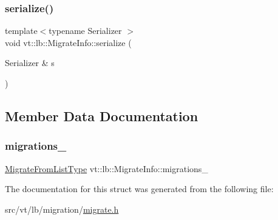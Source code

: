 \subsubsection{\texorpdfstring{serialize()}{serialize()}}
{\footnotesize\ttfamily template$<$typename Serializer $>$ \\
void vt\+::lb\+::\+Migrate\+Info\+::serialize (\begin{DoxyParamCaption}\item[{Serializer \&}]{s }\end{DoxyParamCaption})\hspace{0.3cm}{\ttfamily [inline]}}



\subsection{Member Data Documentation}
\mbox{\label{structvt_1_1lb_1_1_migrate_info_a2ae34d58ae8b7e0d353c790fceed7395}} 
\subsubsection{\texorpdfstring{migrations\+\_\+}{migrations\_}}
{\footnotesize\ttfamily \hyperlink{structvt_1_1lb_1_1_migrate_info_ae62aede65465176ae319e0460b6cb5d7}{Migrate\+From\+List\+Type} vt\+::lb\+::\+Migrate\+Info\+::migrations\+\_\+}



The documentation for this struct was generated from the following file\+:\begin{DoxyCompactItemize}
\item 
src/vt/lb/migration/\hyperlink{migrate_8h}{migrate.\+h}\end{DoxyCompactItemize}
